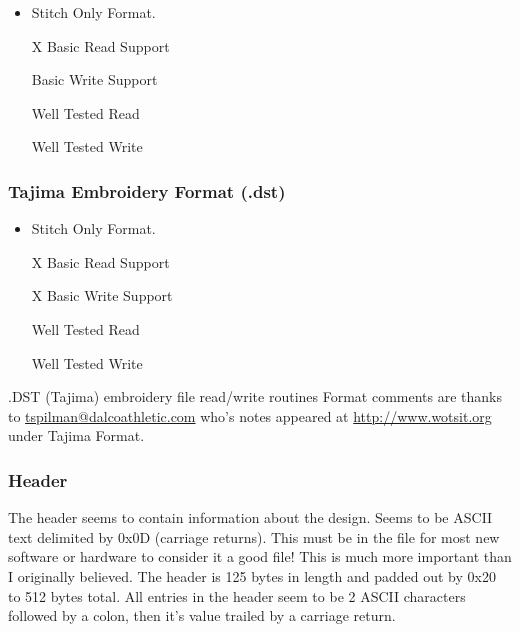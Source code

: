 \documentclass[a4paper, 11pt]{report}
\begin{document}
\begin{itemize}
\item Stitch Only Format.
\item [X] Basic Read Support
\item [ ] Basic Write Support
\item [ ] Well Tested Read
\item [ ] Well Tested Write
\end{itemize}

\subsubsection{Tajima Embroidery Format (.dst)}

\begin{itemize}
\item Stitch Only Format.
\item [X] Basic Read Support
\item [X] Basic Write Support
\item [ ] Well Tested Read
\item [ ] Well Tested Write
\end{itemize}

.DST (Tajima) embroidery file read/write routines
Format comments are thanks to \url{tspilman@dalcoathletic.com} who's
notes appeared at \url{http://www.wotsit.org} under Tajima Format.

\subsubsection{Header}

The header seems to contain information about the design.
Seems to be ASCII text delimited by 0x0D (carriage returns).
This must be in the file for most new software or hardware
to consider it a good file! This is much more important
than I originally believed. The header is 125 bytes in
length and padded out by 0x20 to 512 bytes total.
All entries in the header seem to be 2 ASCII characters
followed by a colon, then it's value trailed by a carriage return.
\end{document}
